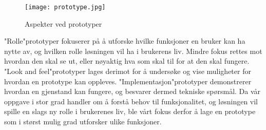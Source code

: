\begin{figure}[H]
\centering
\texttt{[image: prototype.jpg]}
\caption{Aspekter ved prototyper}
\label{fig: prototype}
\end{figure}

\noindent
"Rolle"\-prototyper fokuserer på å utforske hvilke funksjoner en bruker kan ha nytte av, og hvilken rolle løsningen vil ha i brukerens liv. Mindre fokus rettes mot hvordan den skal se ut, eller nøyaktig hva som skal til for at den skal fungere. "Look and feel"\-prototyper lages derimot for å undersøke og vise muligheter for hvordan en prototype kan oppleves. "Implementasjon"\-prototyper demonstrerer hvordan en gjenstand kan fungere, og besvarer dermed tekniske spørsmål. Da vår oppgave i stor grad handler om å forstå behov til funksjonalitet, og løsningen vil spille en slags ny rolle i brukerenes liv, ble vårt fokus derfor å lage en prototype som i størst mulig grad utforsker ulike funksjoner.


